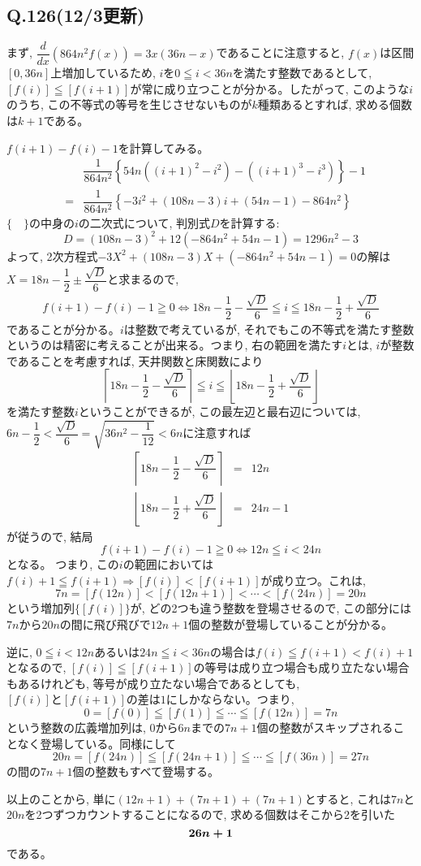 \documentclass[twocolumn]{jbook}
\newcommand{\bolm}[1]{{\mbox{\boldmath $#1$}}}
\newcommand{\dou}{\Leftrightarrow}
\newcommand{\beqn}{\begin{eqnarray*}}
\newcommand{\eeqn}{\end{eqnarray*}}
\newcommand{\nara}{\Rightarrow}
\renewcommand{\leq}{\leqq}
\renewcommand{\geq}{\geqq}
\begin{document}
\subsection*{Q.126(12/3更新)}
まず, $\dfrac{d}{dx}(864n^2f(x)) = 3x(36n - x)$であることに注意すると, $f(x)$は区間$[0,36n]$上増加しているため, $i$を$0\leq i <36n$を満たす整数であるとして, $[f(i)] \leq [f(i+1)]$が常に成り立つことが分かる。したがって, このような$i$のうち, この不等式の等号を生じさせないものが$k$種類あるとすれば, 求める個数は$k+1$である。\par
$f(i+1) - f(i)-1$を計算してみる。
\beqn
&&\dfrac{1}{864n^2}\left\{ 54n((i+1)^2 - i^2)  - ((i+1)^3 - i^3)\right\}-1\\
&=& \dfrac{1}{864n^2}\left\{ -3i^2 + (108n -3)i + (54n-1)-864n^2 \right\}
\eeqn
$\{\quad \}$の中身の$i$の二次式について, 判別式$D$を計算する:
\[D=(108n-3)^2 +12(-864n^2 + 54n-1) =1296n^2 - 3\]
よって, 2次方程式$-3X^2 + (108n-3)X + (-864n^2 + 54n -1) = 0$の解は$X=18n-\dfrac{1}{2} \pm \dfrac{\sqrt{D}}{6}$と求まるので,
\beqn
f(i+1) - f(i) -1 \geq 0 \dou 18n-\dfrac{1}{2} -\dfrac{\sqrt{D}}{6} \leq i \leq 18n-\dfrac{1}{2} +\dfrac{\sqrt{D}}{6}
\eeqn
であることが分かる。$i$は整数で考えているが, それでもこの不等式を満たす整数というのは精密に考えることが出来る。つまり, 右の範囲を満たす$i$とは, $i$が整数であることを考慮すれば, 天井関数と床関数により
\[\left\lceil 18n-\dfrac{1}{2} -\dfrac{\sqrt{D}}{6}\right\rceil \leq i \leq \left\lfloor 18n-\dfrac{1}{2} + \dfrac{\sqrt{D}}{6} \right\rfloor\]
を満たす整数$i$ということができるが, この最左辺と最右辺については, $6n-\dfrac{1}{2} <  \dfrac{\sqrt{D}}{6} = \sqrt{36n^2 - \dfrac{1}{12}} < 6n$に注意すれば
\beqn
\left\lceil 18n-\dfrac{1}{2} -\dfrac{\sqrt{D}}{6}\right\rceil &=& 12n\\
\left\lfloor 18n-\dfrac{1}{2} + \dfrac{\sqrt{D}}{6} \right\rfloor&=& 24n-1
\eeqn
が従うので, 結局
\[f(i+1) - f(i) -1\geq 0 \dou 12n \leq i < 24n\]
となる。
つまり, この$i$の範囲においては $f(i) + 1 \leq f(i+1) \nara \left[ f(i)\right] < \left[ f(i+1) \right]$が成り立つ。これは, 
\[ 7n=[f(12n)] < [f(12n+1)] < \cdots < [f(24n)]=20n\]
という増加列$\{ [f(i)] \}$が, どの2つも違う整数を登場させるので, この部分には$7n$から$20n$の間に飛び飛びで$12n+1$個の整数が登場していることが分かる。
\par
逆に, $0\leq i<12n$あるいは$24n\leq i <36n$の場合は$f(i) \leq f(i+1) < f(i) +1$となるので, $[f(i)] \leq [f(i+1)]$の等号は成り立つ場合も成り立たない場合もあるけれども, 等号が成り立たない場合であるとしても, \bolm{ [f(i)] と [f(i+1)] の差は1にしかならない。}つまり, 
\[0=[f(0)] \leq [f(1)] \leq \cdots \leq [f(12n)] = 7n\]
という整数の広義増加列は, $0$から$6n$までの$7n+1$個の整数がスキップされることなく登場している。同様にして
\[20n=[f(24n)] \leq [f(24n+1)] \leq\cdots \leq [f(36n)] = 27n\]
の間の$7n+1$個の整数もすべて登場する。\par
以上のことから, 単に$(12n+1) + (7n+1) + (7n+1)$とすると, これは$7n$と$20n$を2つずつカウントすることになるので, 求める個数はそこから2を引いた
\[ \bolm{26n+1} \]
である。
\clearpage
\end{document}
